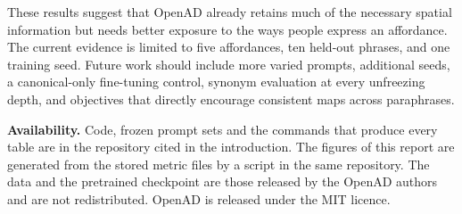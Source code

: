 \documentclass[conference]{IEEEtran}
\begin{document}
These results suggest that OpenAD already retains much of the necessary spatial information but needs better exposure to the ways people express an affordance. The current evidence is limited to five affordances, ten held-out phrases, and one training seed. Future work should include more varied prompts, additional seeds, a canonical-only fine-tuning control, synonym evaluation at every unfreezing depth, and objectives that directly encourage consistent maps across paraphrases.

\textbf{Availability.} Code, frozen prompt sets and the commands that produce every table are in the repository cited in the introduction. The figures of this report are generated from the stored metric files by a script in the same repository. The data and the pretrained checkpoint are those released by the OpenAD authors and are not redistributed. OpenAD is released under the MIT licence.
\end{document}

